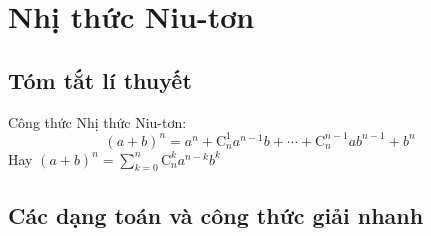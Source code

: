 \section{Nhị thức Niu-tơn}
\subsection{Tóm tắt lí thuyết}
\begin{dn}
	Công thức Nhị thức Niu-tơn:
	$$ (a+b)^n=a^n+\mathrm{C}_n^1a^{n-1}b+\cdots+\mathrm{C}_n^{n-1}ab^{n-1}+b^n $$
	\centering Hay $ (a+b)^n=\sum\limits_{k=0}^n \mathrm{C}_n^ka^{n-k}b^k $
\end{dn}

\subsection{Các dạng toán và công thức giải nhanh}

